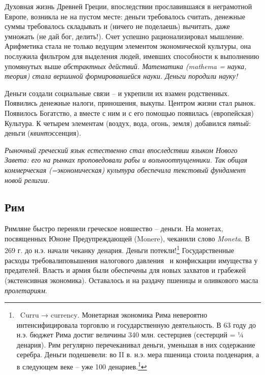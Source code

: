 Духовная жизнь Древней Греции, впоследствии прославившаяся в неграмотной Европе, возникла не на пустом месте: деньги
требовалось считать, денежные суммы требовалось складывать и (ничего не поделаешь) вычитать, даже умножать (не дай бог,
делить!). Счет успешно рационализировал мышление. Арифметика стала не только ведущим элементом экономической культуры,
она послужила фильтром для выделения людей, имевших способности к выполнению упомянутых выше \textit{абстрактных
действий. Математика (\foreignlanguage{english}{mathema} = наука, теория) стала вершиной формировавшейся науки. Деньги
породили науку!}


Деньги создали социальные связи – и укрепили их взамен родственных. Появились денежные налоги, приношения, выкупы.
Центром жизни стал рынок. Появилось Богатство, а вместе с ним и с его помощью появилась (европейская) Культура. К
четырем элементам (воздух, вода, огонь, земля) добавился \textit{пятый}: \-деньги
(\flqq \textit{квинт}эссенция\frqq).

{\itshape
Рыночный греческий язык естественно стал впоследствии языком Нового Завета: его на рынках проповедовали рабы и
вольноотпущенники. Так общая коммерческая (=экономическая) культура обеспечила текстовый фундамент новой религии.}

\subsection[Рим]{Рим}

Римляне быстро переняли греческое новшество – деньги. На монетах, посвященных Юноне Предупреждающей
(\foreignlanguage{english}{Monere}), чеканили слово \foreignlanguage{english}{\textit{Moneta}}. В 269 г. до н.э. начали
чеканку денария. Деньги потекли!\footnote{\ \foreignlanguage{english}{Curru → currency}. Монетарная экономика Рима
невероятно интенсифицировала торговлю и государственную деятельность. В 63 году до н.э. бюджет Рима достиг величины 340
млн. сестерциев (сестерций = ¼ денария). Рим регулярно перечеканивал деньги, уменьшая в них содержание серебра. Деньги
\flqq подешевели\frqq: во \foreignlanguage{english}{II} в. н.э. мера пшеница стоила полденария, а в
следующем веке – уже 100 денариев.\footnote{Тем самым вырос ВВП!}} Государственные расходы
\flqq требовали\frqq повышения налогового давления \ и конфискации имущества у
\flqq предателей\frqq. Власть и армия были обеспечены для новых захватов и грабежей (экстенсивная
экономика). Оставалось и на раздачу пшеницы и оливкового масла \textit{пролетариям}.


